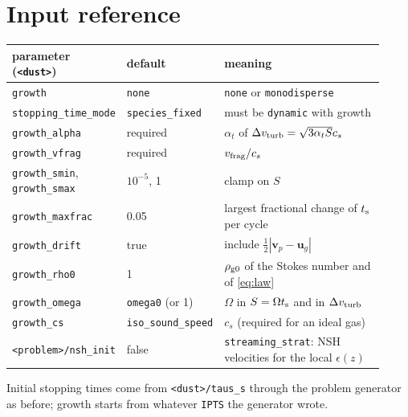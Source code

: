 \documentclass[11pt]{article}
\newcommand{\code}[1]{\texttt{#1}}
\newcommand{\St}{S}
\newcommand{\ts}{t_{\rm s}}
\newcommand{\vf}{v_{\rm frag}}
\begin{document}
\section{Input reference}\label{sec:inputs}
\begin{longtable}{>{\raggedright}p{0.26\linewidth}>{\raggedright}p{0.17\linewidth}p{0.49\linewidth}}
\toprule
parameter (\code{<dust>}) & default & meaning \\
\midrule
\code{growth} & \code{none} & \code{none} or \code{monodisperse} \\
\code{stopping\_time\_mode} & \code{species\_fixed} & must be \code{dynamic} with growth \\
\code{growth\_alpha} & required & $\alpha_t$ of $\Delta v_{\rm turb}=\sqrt{3\alpha_t\St}c_s$ \\
\code{growth\_vfrag} & required & $\vf/c_s$ \\
\code{growth\_smin}, \code{growth\_smax} & $10^{-5}$, 1 & clamp on $\St$ \\
\code{growth\_maxfrac} & 0.05 & largest fractional change of $\ts$ per cycle \\
\code{growth\_drift} & true & include $\frac12|\mathbf v_p-\mathbf u_g|$ \\
\code{growth\_rho0} & 1 & $\rho_{\rm g0}$ of the Stokes number and of \eqref{eq:law} \\
\code{growth\_omega} & \code{omega0} (or 1) & $\Omega$ in $\St=\Omega\ts$ and in
  $\Delta v_{\rm turb}$ \\
\code{growth\_cs} & \code{iso\_sound\_speed} & $c_s$ (required for an ideal gas) \\
\midrule
\code{<problem>/nsh\_init} & false & \code{streaming\_strat}: NSH velocities for the local
  $\epsilon(z)$ \\
\bottomrule
\end{longtable}
Initial stopping times come from \code{<dust>/taus\_s} through the problem generator as
before; growth starts from whatever \code{IPTS} the generator wrote.

\end{document}
